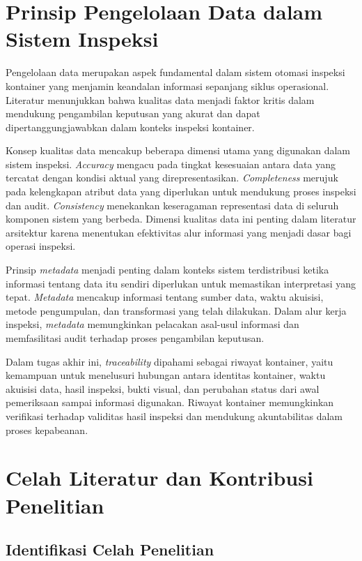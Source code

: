 \section{Prinsip Pengelolaan Data dalam Sistem Inspeksi}

Pengelolaan data merupakan aspek fundamental dalam sistem otomasi inspeksi kontainer yang menjamin keandalan informasi sepanjang siklus operasional. Literatur menunjukkan bahwa kualitas data menjadi faktor kritis dalam mendukung pengambilan keputusan yang akurat dan dapat dipertanggungjawabkan dalam konteks inspeksi kontainer.

Konsep kualitas data mencakup beberapa dimensi utama yang digunakan dalam
sistem inspeksi. \textit{Accuracy} mengacu pada tingkat kesesuaian antara data
yang tercatat dengan kondisi aktual yang direpresentasikan.
\textit{Completeness} merujuk pada kelengkapan atribut data yang diperlukan
untuk mendukung proses inspeksi dan audit. \textit{Consistency} menekankan
keseragaman representasi data di seluruh komponen sistem yang berbeda. Dimensi
kualitas data ini penting dalam literatur arsitektur karena menentukan
efektivitas alur informasi yang menjadi dasar bagi operasi inspeksi.

Prinsip \textit{metadata} menjadi penting dalam konteks sistem terdistribusi
ketika informasi tentang data itu sendiri diperlukan untuk memastikan
interpretasi yang tepat. \textit{Metadata} mencakup informasi tentang sumber
data, waktu akuisisi, metode pengumpulan, dan transformasi yang telah
dilakukan. Dalam alur kerja inspeksi, \textit{metadata} memungkinkan pelacakan
asal-usul informasi dan memfasilitasi audit terhadap proses pengambilan
keputusan.

Dalam tugas akhir ini, \textit{traceability} dipahami sebagai riwayat kontainer,
yaitu kemampuan untuk menelusuri hubungan antara identitas kontainer, waktu
akuisisi data, hasil inspeksi, bukti visual, dan perubahan status dari awal
pemeriksaan sampai informasi digunakan. Riwayat kontainer memungkinkan
verifikasi terhadap validitas hasil inspeksi dan mendukung akuntabilitas dalam
proses kepabeanan.

\section{Celah Literatur dan Kontribusi Penelitian}

\subsection{Identifikasi Celah Penelitian}

